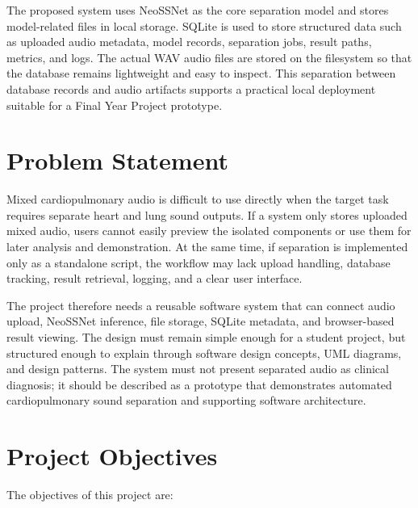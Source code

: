 The proposed system uses NeoSSNet as the core separation model and stores model-related files in local storage. SQLite is used to store structured data such as uploaded audio metadata, model records, separation jobs, result paths, metrics, and logs. The actual WAV audio files are stored on the filesystem so that the database remains lightweight and easy to inspect. This separation between database records and audio artifacts supports a practical local deployment suitable for a Final Year Project prototype.

\section{Problem Statement}

Mixed cardiopulmonary audio is difficult to use directly when the target task requires separate heart and lung sound outputs. If a system only stores uploaded mixed audio, users cannot easily preview the isolated components or use them for later analysis and demonstration. At the same time, if separation is implemented only as a standalone script, the workflow may lack upload handling, database tracking, result retrieval, logging, and a clear user interface.

The project therefore needs a reusable software system that can connect audio upload, NeoSSNet inference, file storage, SQLite metadata, and browser-based result viewing. The design must remain simple enough for a student project, but structured enough to explain through software design concepts, UML diagrams, and design patterns. The system must not present separated audio as clinical diagnosis; it should be described as a prototype that demonstrates automated cardiopulmonary sound separation and supporting software architecture.

\section{Project Objectives}

The objectives of this project are:

